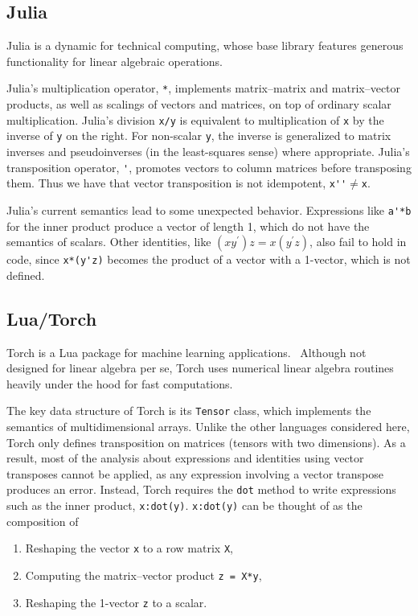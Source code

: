 \subsection{Julia}

Julia is a dynamic for technical computing, whose base library features
generous functionality for linear algebraic operations.~\cite{Bezanson2012}

Julia's multiplication operator, \verb`*`, implements matrix--matrix and
matrix--vector products, as well as scalings of vectors and matrices, on top of
ordinary scalar multiplication.
Julia's division \verb`x/y` is equivalent to multiplication of \verb`x` by the
inverse of \verb`y` on the right. For non-scalar \verb`y`, the inverse is
generalized to matrix inverses and pseudoinverses (in the least-squares sense)
where appropriate.
Julia's transposition operator, \verb`'`, promotes vectors to column matrices
before transposing them. Thus we have that vector transposition is not
idempotent, \verb`x''`$\ne$\verb`x`.

Julia's current semantics lead to some unexpected behavior. Expressions like
\verb`a'*b` for the inner product produce a vector of length 1, which do not
have the semantics of scalars. Other identities, like $(xy^\prime)z =
x(y^\prime z)$, also fail to hold in code, since \verb`x*(y'z)` becomes the
product of a vector with a 1-vector, which is not defined.


\subsection{Lua/Torch}

Torch is a Lua\cite{Lua} package for machine learning applications.~\cite{Torch}
Although not designed for linear algebra per se, Torch uses numerical linear
algebra routines heavily under the hood for fast computations.

The key data structure of Torch is its \verb`Tensor` class, which implements
the semantics of multidimensional arrays. Unlike the other languages considered
here, Torch only defines transposition on matrices (tensors with two
dimensions). As a result, most of the analysis about expressions and identities
using vector transposes cannot be applied, as any expression involving a vector
transpose produces an error.
Instead, Torch requires the \verb`dot` method to write expressions such as the inner product,
\verb`x:dot(y)`. \verb`x:dot(y)` can be thought of as the composition of
\begin{enumerate}

\item
Reshaping the vector \verb`x` to a row matrix \verb`X`,

\item
Computing the matrix--vector product \verb`z = X*y`,

\item
Reshaping the 1-vector \verb`z` to a scalar.

\end{enumerate}

